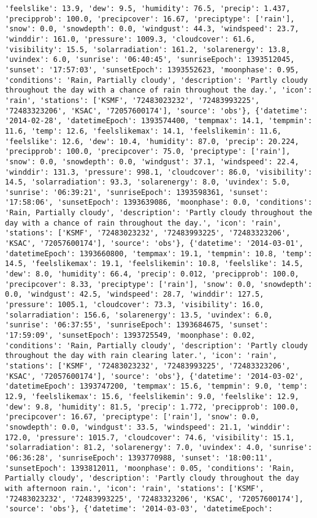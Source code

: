 \documentclass[
  letterpaper,
  DIV=11,
  numbers=noendperiod]{scrartcl}
\begin{document}
\begin{verbatim}
'feelslike': 13.9, 'dew': 9.5, 'humidity': 76.5, 'precip': 1.437, 'precipprob': 100.0, 'precipcover': 16.67, 'preciptype': ['rain'], 'snow': 0.0, 'snowdepth': 0.0, 'windgust': 44.3, 'windspeed': 23.7, 'winddir': 161.0, 'pressure': 1009.3, 'cloudcover': 61.6, 'visibility': 15.5, 'solarradiation': 161.2, 'solarenergy': 13.8, 'uvindex': 6.0, 'sunrise': '06:40:45', 'sunriseEpoch': 1393512045, 'sunset': '17:57:03', 'sunsetEpoch': 1393552623, 'moonphase': 0.95, 'conditions': 'Rain, Partially cloudy', 'description': 'Partly cloudy throughout the day with a chance of rain throughout the day.', 'icon': 'rain', 'stations': ['KSMF', '72483023232', '72483993225', '72483323206', 'KSAC', '72057600174'], 'source': 'obs'}, {'datetime': '2014-02-28', 'datetimeEpoch': 1393574400, 'tempmax': 14.1, 'tempmin': 11.6, 'temp': 12.6, 'feelslikemax': 14.1, 'feelslikemin': 11.6, 'feelslike': 12.6, 'dew': 10.4, 'humidity': 87.0, 'precip': 20.224, 'precipprob': 100.0, 'precipcover': 75.0, 'preciptype': ['rain'], 'snow': 0.0, 'snowdepth': 0.0, 'windgust': 37.1, 'windspeed': 22.4, 'winddir': 131.3, 'pressure': 998.1, 'cloudcover': 86.0, 'visibility': 14.5, 'solarradiation': 93.3, 'solarenergy': 8.0, 'uvindex': 5.0, 'sunrise': '06:39:21', 'sunriseEpoch': 1393598361, 'sunset': '17:58:06', 'sunsetEpoch': 1393639086, 'moonphase': 0.0, 'conditions': 'Rain, Partially cloudy', 'description': 'Partly cloudy throughout the day with a chance of rain throughout the day.', 'icon': 'rain', 'stations': ['KSMF', '72483023232', '72483993225', '72483323206', 'KSAC', '72057600174'], 'source': 'obs'}, {'datetime': '2014-03-01', 'datetimeEpoch': 1393660800, 'tempmax': 19.1, 'tempmin': 10.8, 'temp': 14.5, 'feelslikemax': 19.1, 'feelslikemin': 10.8, 'feelslike': 14.5, 'dew': 8.0, 'humidity': 66.4, 'precip': 0.012, 'precipprob': 100.0, 'precipcover': 8.33, 'preciptype': ['rain'], 'snow': 0.0, 'snowdepth': 0.0, 'windgust': 42.5, 'windspeed': 28.7, 'winddir': 127.5, 'pressure': 1005.1, 'cloudcover': 73.3, 'visibility': 16.0, 'solarradiation': 156.6, 'solarenergy': 13.5, 'uvindex': 6.0, 'sunrise': '06:37:55', 'sunriseEpoch': 1393684675, 'sunset': '17:59:09', 'sunsetEpoch': 1393725549, 'moonphase': 0.02, 'conditions': 'Rain, Partially cloudy', 'description': 'Partly cloudy throughout the day with rain clearing later.', 'icon': 'rain', 'stations': ['KSMF', '72483023232', '72483993225', '72483323206', 'KSAC', '72057600174'], 'source': 'obs'}, {'datetime': '2014-03-02', 'datetimeEpoch': 1393747200, 'tempmax': 15.6, 'tempmin': 9.0, 'temp': 12.9, 'feelslikemax': 15.6, 'feelslikemin': 9.0, 'feelslike': 12.9, 'dew': 9.8, 'humidity': 81.5, 'precip': 1.772, 'precipprob': 100.0, 'precipcover': 16.67, 'preciptype': ['rain'], 'snow': 0.0, 'snowdepth': 0.0, 'windgust': 33.5, 'windspeed': 21.1, 'winddir': 172.0, 'pressure': 1015.7, 'cloudcover': 74.6, 'visibility': 15.1, 'solarradiation': 81.2, 'solarenergy': 7.0, 'uvindex': 4.0, 'sunrise': '06:36:28', 'sunriseEpoch': 1393770988, 'sunset': '18:00:11', 'sunsetEpoch': 1393812011, 'moonphase': 0.05, 'conditions': 'Rain, Partially cloudy', 'description': 'Partly cloudy throughout the day with afternoon rain.', 'icon': 'rain', 'stations': ['KSMF', '72483023232', '72483993225', '72483323206', 'KSAC', '72057600174'], 'source': 'obs'}, {'datetime': '2014-03-03', 'datetimeEpoch': 
\end{verbatim}
\end{document}
